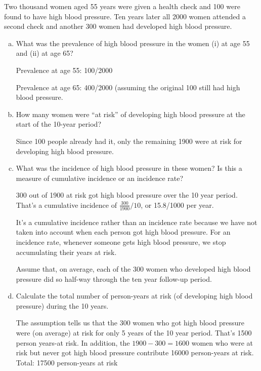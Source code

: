 
Two thousand women aged 55 years were given a health check and 100
were found to have high blood pressure.  Ten years later all 2000
women attended a second check and another 300 women had developed high
blood pressure.

\begin{enumerate}[(a)]

\item What was the prevalence of high blood pressure in the women (i)
  at age 55 and (ii) at age 65?
\answerSpace{.6in}
\begin{AnswerText}
Prevalence at age 55: 100/2000

Prevalence at age 65: 400/2000 (assuming the original 100 still had
high blood pressure.
\end{AnswerText}
\item How many women were ``at risk'' of developing high blood
  pressure at the start of the 10-year period?
\answerSpace{.6in}
\begin{AnswerText}
Since 100 people already had it, only the remaining 1900 were at risk for
developing high blood pressure.
\end{AnswerText}

\item What was the incidence of high blood pressure in these women?
  Is this a measure of cumulative incidence or an incidence rate?
\answerSpace{.6in}
\begin{AnswerText}
300 out of 1900 at risk got high blood pressure over the 10 year period.
That's a cumulative incidence of $\frac{300}{1900}/10$, or 15.8/1000
per year.

It's a cumulative incidence rather than an incidence rate because we
have not taken into account when each person got high blood pressure.
For an incidence rate, whenever someone gets high blood pressure, we
stop accumulating their years at risk.
\end{AnswerText}

\noindent Assume that, on average, each of the 300 women who developed
high blood pressure did so half-way through the ten year follow-up
period.
\item Calculate the total number of person-years at risk (of
  developing high blood pressure) during the 10 years.

\answerSpace{.6in}
\begin{AnswerText}
The assumption tells us that the 300 women who got high blood pressure
were (on average) at risk for only 5 years of the 10 year period.
That's 1500 person years-at risk.  In addition, the $1900-300=1600 $
women who were at risk but never got high blood pressure contribute
16000 person-years at risk.  Total: 17500 person-years at risk
\end{AnswerText}




\end{enumerate}
